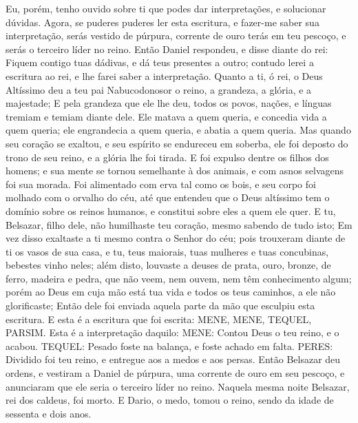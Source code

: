 {Eu, porém, tenho ouvido sobre ti que podes dar interpretações, e solucionar dúvidas. Agora, se puderes puderes ler esta escritura, e fazer-me saber sua interpretação, serás vestido de púrpura, corrente de ouro terás em teu pescoço, e serás o terceiro líder no reino.
Então Daniel respondeu, e disse diante do rei: Fiquem contigo tuas dádivas, e dá teus presentes a outro; contudo lerei a escritura ao rei, e lhe farei saber a interpretação.
Quanto a ti, ó rei, o Deus Altíssimo deu a teu pai Nabucodonosor o reino, a grandeza, a glória, e a majestade;
E pela grandeza que ele lhe deu, todos os povos, nações, e línguas tremiam e temiam diante dele. Ele matava a quem queria, e concedia vida a quem queria; ele engrandecia a quem queria, e abatia a quem queria.
Mas quando seu coração se exaltou, e seu espírito se endureceu em soberba, ele foi deposto do trono de seu reino, e a glória lhe foi tirada.
E foi expulso dentre os filhos dos homens; e sua mente
 se tornou semelhante à dos animais, e com asnos selvagens foi sua morada. Foi alimentado com erva tal como os bois, e seu corpo foi molhado com o orvalho do céu, até que entendeu que o Deus altíssimo tem o domínio sobre os reinos humanos, e constitui sobre eles a quem ele quer.
E tu, Belsazar, filho dele, não humilhaste teu coração, mesmo sabendo de tudo isto;
Em vez disso exaltaste a ti mesmo contra o Senhor do céu; pois trouxeram diante de ti os vasos de sua casa, e tu, teus maiorais, tuas mulheres e tuas concubinas, bebestes vinho neles; além disto, louvaste a deuses de prata, ouro, bronze, de ferro, madeira e pedra, que não veem, nem ouvem, nem têm conhecimento algum; porém ao Deus em cuja mão está tua vida e todos os teus caminhos, a ele não glorificaste;
Então dele foi enviada aquela parte da mão que esculpiu esta escritura.
E esta é a escritura que foi escrita: MENE, MENE, TEQUEL, PARSIM.
Esta é a interpretação daquilo: MENE: Contou Deus o teu reino, e o acabou.
TEQUEL: Pesado foste na balança, e foste achado em falta.
PERES: Dividido foi teu reino, e entregue aos a medos e aos persas.
Então Belsazar deu ordens, e vestiram a Daniel de púrpura,
{} uma corrente de ouro em seu pescoço, e anunciaram que ele seria o terceiro líder no reino.
Naquela mesma noite Belsazar, rei dos caldeus, foi morto.
E Dario, o medo, tomou o reino, sendo da idade de sessenta e dois anos.

\par }

